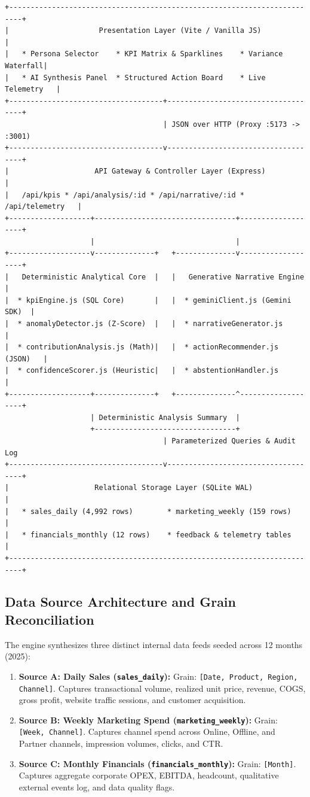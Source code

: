 \documentclass[11pt,a4paper]{article}
\begin{document}
\begin{verbatim}
+-------------------------------------------------------------------------+
|                     Presentation Layer (Vite / Vanilla JS)              |
|   * Persona Selector    * KPI Matrix & Sparklines    * Variance Waterfall|
|   * AI Synthesis Panel  * Structured Action Board    * Live Telemetry   |
+------------------------------------+------------------------------------+
                                     | JSON over HTTP (Proxy :5173 -> :3001)
+------------------------------------v------------------------------------+
|                    API Gateway & Controller Layer (Express)             |
|   /api/kpis * /api/analysis/:id * /api/narrative/:id * /api/telemetry   |
+-------------------+---------------------------------+-------------------+
                    |                                 |
+-------------------v--------------+   +--------------v-------------------+
|   Deterministic Analytical Core  |   |   Generative Narrative Engine    |
|  * kpiEngine.js (SQL Core)       |   |  * geminiClient.js (Gemini SDK)  |
|  * anomalyDetector.js (Z-Score)  |   |  * narrativeGenerator.js         |
|  * contributionAnalysis.js (Math)|   |  * actionRecommender.js (JSON)   |
|  * confidenceScorer.js (Heuristic|   |  * abstentionHandler.js          |
+-------------------+--------------+   +--------------^-------------------+
                    | Deterministic Analysis Summary  |
                    +---------------------------------+
                                     | Parameterized Queries & Audit Log
+------------------------------------v------------------------------------+
|                    Relational Storage Layer (SQLite WAL)                |
|   * sales_daily (4,992 rows)        * marketing_weekly (159 rows)       |
|   * financials_monthly (12 rows)    * feedback & telemetry tables       |
+-------------------------------------------------------------------------+
\end{verbatim}

\subsection{Data Source Architecture and Grain Reconciliation}
The engine synthesizes three distinct internal data feeds seeded across 12 months (2025):
\begin{enumerate}
    \item \textbf{Source A: Daily Sales (\texttt{sales\_daily}):} Grain: \texttt{[Date, Product, Region, Channel]}. Captures transactional volume, realized unit price, revenue, COGS, gross profit, website traffic sessions, and customer acquisition.
    \item \textbf{Source B: Weekly Marketing Spend (\texttt{marketing\_weekly}):} Grain: \texttt{[Week, Channel]}. Captures channel spend across Online, Offline, and Partner channels, impression volumes, clicks, and CTR.
    \item \textbf{Source C: Monthly Financials (\texttt{financials\_monthly}):} Grain: \texttt{[Month]}. Captures aggregate corporate OPEX, EBITDA, headcount, qualitative external events log, and data quality flags.
\end{enumerate}
\end{document}
